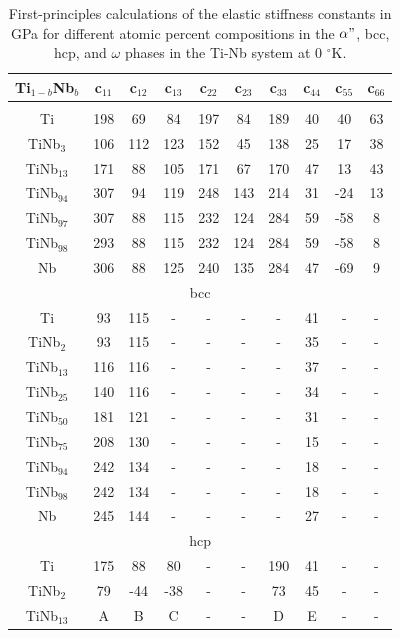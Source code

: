 \newpage
\begin{longtable}[H]{ c c c c c c c c c c }
	\caption{First-principles calculations of the elastic stiffness constants in GPa for different atomic percent compositions in the $\alpha"$, bcc, hcp, and $\omega$  phases in the Ti-Nb system at 0 $^\circ$K.} 	\label{Ch7-table:tinbdata} \\
	\hline
	Ti$_{1-b}$Nb$_b$ & c$_{11}$ & c$_{12}$ & c$_{13}$ & c$_{22}$ & c$_{23}$ & c$_{33}$ & c$_{44}$ & c$_{55}$ & c$_{66}$\\
	\hline
	\endhead
	\hline
	\endfoot
	\multicolumn{10}{c}{$\alpha"$}\\
	\hline
	Ti & 198 & 69 & 84 & 197 & 84 & 189 & 40 & 40 & 63 \\		
	TiNb$_{3}$ & 106 & 112 & 123 & 152 & 45 & 138 & 25 & 17 & 38 \\
	TiNb$_{13}$ & 171 & 88 & 105 & 171 & 67 & 170 & 47 & 13 & 43 \\
	TiNb$_{94}$ & 307 & 94 & 119 & 248 & 143 & 214 & 31 & -24 & 13 \\
	TiNb$_{97}$ & 307 & 88 & 115 & 232 & 124 & 284 & 59 & -58 & 8 \\
	TiNb$_{98}$ & 293 & 88 & 115 & 232 & 124 & 284 & 59 & -58 & 8 \\
	Nb & 306 & 88 & 125 & 240 & 135 & 284 & 47 & -69 & 9 \\
	\hline
	\multicolumn{10}{c}{bcc}\\
	\hline
	Ti & 93 & 115 & - & - & - & - & 41 & - & - \\		
	TiNb$_{2}$ & 93 & 115 & - & - & - & - & 35 & - & - \\
	TiNb$_{13}$ & 116 & 116 & - & - & - & - & 37 & - & - \\
	TiNb$_{25}$ & 140 & 116 & - & - & - & - & 34 & - & - \\
	TiNb$_{50}$ & 181 & 121 & - & - & - & - & 31 & - & - \\
	TiNb$_{75}$ & 208 & 130 & - & - & - & - & 15 & - & - \\
	TiNb$_{94}$ & 242 & 134 & - & - & - & - & 18 & - & - \\
	TiNb$_{98}$ & 242 & 134 & - & - & - & - & 18 & - & - \\
	Nb & 245 & 144 & - & - & - & - & 27 & - & - \\
	\hline
	\multicolumn{10}{c}{hcp}\\
	\hline
	Ti & 175 & 88 & 80 & - & - & 190 & 41 & - & - \\		
	TiNb$_{2}$ & 79 & -44 & -38 & - & - & 73 & 45 & - & - \\
	TiNb$_{13}$ & A & B & C & - & - & D & E & - & - \\

\end{longtable}
